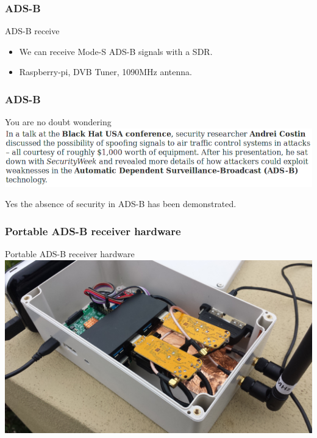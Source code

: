 \begin{frame}
\frametitle{ADS-B}
\begin{block}{ADS-B receive}
\begin{itemize}
\item<1-> We can receive Mode-S ADS-B signals with a SDR.
\item<2-> Raspberry-pi, DVB Tuner, 1090MHz antenna.
\end{itemize}
\end{block}
\end{frame}

\begin{frame}
\frametitle{ADS-B}
\begin{block}{You are no doubt wondering}
\includegraphics[height=0.18\textheight]{image/adsb-security.png}
\end{block}
Yes the absence of security in ADS-B has been demonstrated.
\end{frame}

\begin{frame}
\frametitle{Portable ADS-B receiver hardware}
\begin{block}{Portable ADS-B receiver hardware}
\includegraphics[height=0.5\textheight]{image/adsb-hardware.png}
\end{block}
\end{frame}

